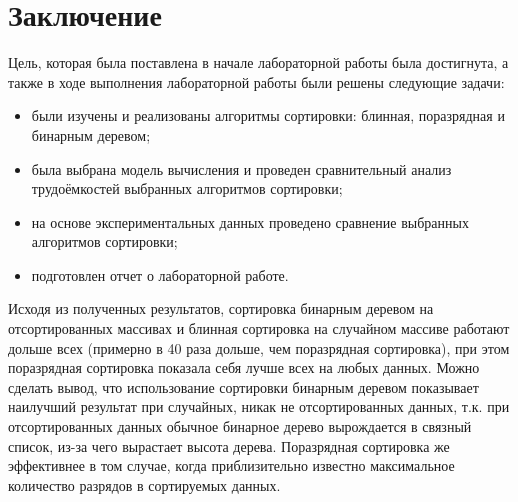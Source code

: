 \chapter*{Заключение}

Цель, которая была поставлена в начале лабораторной работы была достигнута, а также в ходе выполнения лабораторной работы были решены следующие задачи:

\begin{itemize}
	\item были изучены и реализованы алгоритмы сортировки: блинная, поразрядная и бинарным деревом;
	\item была выбрана модель вычисления и проведен сравнительный анализ трудоёмкостей выбранных алгоритмов сортировки;
    \item на основе экспериментальных данных проведено сравнение выбранных алгоритмов сортировки;
	\item подготовлен отчет о лабораторной работе.
\end{itemize}

Исходя из полученных результатов, сортировка бинарным деревом на отсортированных массивах и блинная сортировка на случайном массиве работают дольше всех (примерно в 40 раза дольше, чем поразрядная сортировка), при этом поразрядная сортировка показала себя лучше всех на любых данных. Можно сделать вывод, что использование сортировки бинарным деревом показывает наилучший результат при случайных, никак не отсортированных данных, т.к. при отсортированных данных обычное бинарное дерево вырождается в связный список, из-за чего вырастает высота дерева. Поразрядная сортировка же эффективнее в том случае, когда приблизительно известно максимальное количество разрядов в сортируемых данных.